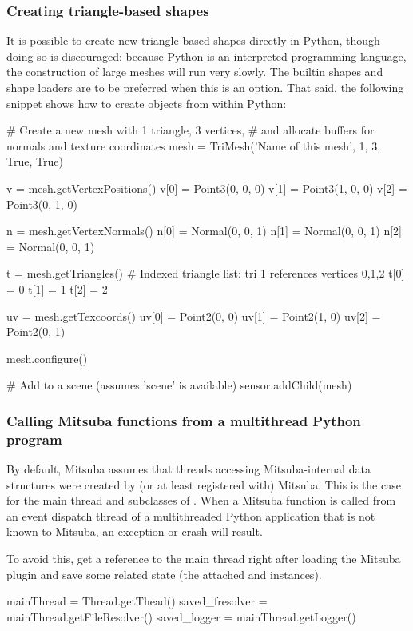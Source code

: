 \subsubsection{Creating triangle-based shapes}
It is possible to create new triangle-based shapes directly in Python, though
doing so is discouraged: because Python is an interpreted programming language,
the construction of large meshes will run very slowly. The builtin shapes
and shape loaders are to be preferred when this is an option. That said, the
following snippet shows how to create  objects from within Python:
\begin{python}
# Create a new mesh with 1 triangle, 3 vertices,
# and allocate buffers for normals and texture coordinates
mesh = TriMesh('Name of this mesh', 1, 3, True, True)

v = mesh.getVertexPositions()
v[0] = Point3(0, 0, 0)
v[1] = Point3(1, 0, 0)
v[2] = Point3(0, 1, 0)

n = mesh.getVertexNormals()
n[0] = Normal(0, 0, 1)
n[1] = Normal(0, 0, 1)
n[2] = Normal(0, 0, 1)

t = mesh.getTriangles() # Indexed triangle list: tri 1 references vertices 0,1,2
t[0] = 0
t[1] = 1
t[2] = 2

uv = mesh.getTexcoords()
uv[0] = Point2(0, 0)
uv[1] = Point2(1, 0)
uv[2] = Point2(0, 1)

mesh.configure()

# Add to a scene (assumes 'scene' is available)
sensor.addChild(mesh)
\end{python}


\subsubsection{Calling Mitsuba functions from a multithread Python program}
By default, Mitsuba assumes that threads accessing Mitsuba-internal
data structures were created by (or at least registered with) Mitsuba. This is the
case for the main thread and subclasses of . When a
Mitsuba function is called from an event dispatch thread of a multithreaded
Python application that is not known to Mitsuba, an exception or crash will result.

To avoid this, get a reference to the main thread right after loading the Mitsuba plugin
and save some related state (the attached  and  instances).
\begin{python}
mainThread = Thread.getThead()
saved_fresolver = mainThread.getFileResolver()
saved_logger = mainThread.getLogger()
\end{python}

